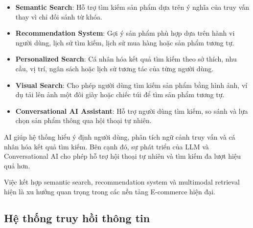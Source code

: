\begin{itemize}
    \item \textbf{Semantic Search}: Hỗ trợ tìm kiếm sản phẩm dựa trên ý nghĩa của truy vấn thay vì chỉ đối sánh từ khóa.
    
    \item \textbf{Recommendation System}: Gợi ý sản phẩm phù hợp dựa trên hành vi người dùng, lịch sử tìm kiếm, lịch sử mua hàng hoặc sản phẩm tương tự.
    
    \item \textbf{Personalized Search}: Cá nhân hóa kết quả tìm kiếm theo sở thích, nhu cầu, vị trí, ngân sách hoặc lịch sử tương tác của từng người dùng.
    
    \item \textbf{Visual Search}: Cho phép người dùng tìm kiếm sản phẩm bằng hình ảnh, ví dụ tải lên ảnh một đôi giày hoặc chiếc túi để tìm sản phẩm tương tự.
    
    \item \textbf{Conversational AI Assistant}: Hỗ trợ người dùng tìm kiếm, so sánh và lựa chọn sản phẩm thông qua hội thoại tự nhiên.
\end{itemize}

AI giúp hệ thống hiểu ý định người dùng, phân tích ngữ cảnh truy vấn và cá nhân hóa kết quả tìm kiếm. Bên cạnh đó, sự phát triển của LLM và Conversational AI cho phép hỗ trợ hội thoại tự nhiên và tìm kiếm đa lượt hiệu quả hơn.

Việc kết hợp semantic search, recommendation system và multimodal retrieval hiện là xu hướng quan trọng trong các nền tảng E-commerce hiện đại.
\subsection{Hệ thống truy hồi thông tin}



